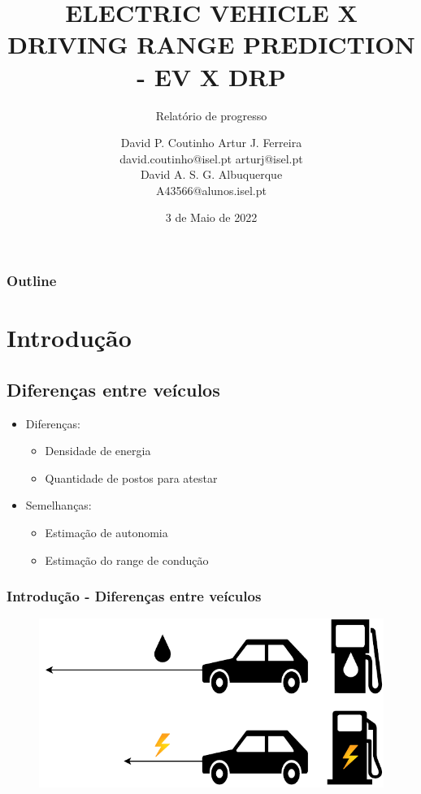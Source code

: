 \documentclass{beamer}
\title{\uppercase{Electric Vehicle X Driving Range Prediction - EV X DRP}}
\subtitle{Relatório de progresso}
\author{
	{\large David P. Coutinho \qquad Artur J. Ferreira} \\
	{\qquad \hspace{-1cm} david.coutinho@isel.pt \qquad arturj@isel.pt} \\
    {\vspace{1cm}}
    {\large David A. S. G. Albuquerque} \\
    {A43566@alunos.isel.pt}
}
\institute
{
	\vspace{0.5cm} \\
	{\normalsize Instituto Superior de Engenharia de Lisboa } \\
}
\date{
	\vspace{-0.75cm}
	3 de Maio de 2022
}
\begin{document}
\begin{frame}[t,plain]
    \titlepage
\end{frame}

\begin{frame}
    \frametitle{Outline}
    \tableofcontents
\end{frame}

\section[Introdução]{Introdução}

\subsection[Diferenças entre veículos]{Diferenças entre veículos}
\begin{frame}
	\begin{itemize}
		\item Diferenças:
		\begin{itemize}
			\item Densidade de energia
			\item Quantidade de postos para atestar
		\end{itemize}
		\item Semelhanças:
		\begin{itemize}
			\item Estimação de autonomia
			\item Estimação do range de condução
		\end{itemize}
	\end{itemize}
	\frametitle{Introdução - Diferenças entre veículos}
	\begin{figure}[H]
		\begin{center}
			\includegraphics[scale=0.6]{./figures/ev_vs_gas_eRange.pdf}
		\end{center}
	\end{figure}
\end{frame}
\end{document}
